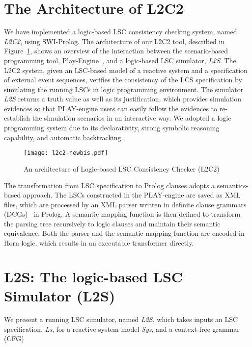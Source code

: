 \documentclass[]{llncs}
\begin{document}
\section{The Architecture of L2C2}
\label{sec:l2c2}

We have implemented a logic-based LSC consistency checking
system, named {\em L2C2}, using SWI-Prolog.
The architecture of our L2C2 tool, described in Figure~\ref{fig:l2c2},
shows an overview of the interaction between the scenario-based programming
tool, Play-Engine~\cite{HM03}, and a logic-based LSC simulator,
{\em L2S}. The L2C2 system, given an LSC-based model
of a reactive system and a specification
of external event sequences, verifies the consistency
of the LCS specification by simulating the running LSCs in
logic programming environment. The simulator {\em L2S} returns a
truth value as well as its justification, which provides simulation evidences
so that PLAY-engine users can easily follow the evidences to re-establish
the simulation scenarios in an interactive way. We adopted a logic programming
system due to its declarativity, strong symbolic reasoning capability,
and automatic backtracking.


\begin{figure}
	\centering
\texttt{[image: l2c2-newbis.pdf]}\\
\caption{An architecture of Logic-based LSC Consistency Checker (L2C2)}
\label{fig:l2c2}
\end{figure}



The transformation from LSC specification to Prolog clauses adopts a
semantics-based approach.
The LSCs constructed in the PLAY-engine
are saved as XML files, which are processed by an XML parser written
in definite clause grammars (DCGs)~\cite{Abramson84} in Prolog. A semantic mapping function
is then defined to transform the parsing tree recursively to
logic clauses and maintain their semantic equivalence.
Both the parser and the semantic mapping function are encoded in Horn logic,
which results in an executable transformer directly.


\section{L2S: The logic-based LSC Simulator (L2S)}
\label{sec:l2s}

We present a running LSC simulator, named {\em L2S}, which takes inputs
an LSC specification, {\em Ls}, for a reactive system model {\em Sys},
and a context-free grammar (CFG)
\end{document}
